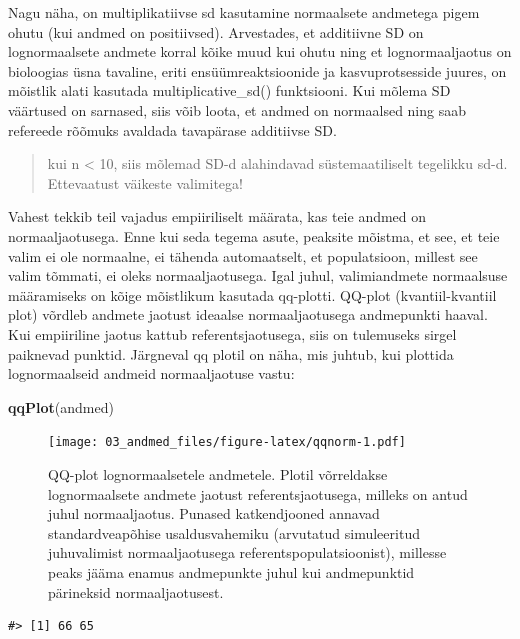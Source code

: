 \documentclass[]{book}
\newenvironment{Shaded}{\begin{snugshade}}{\end{snugshade}}
\newcommand{\KeywordTok}[1]{\textcolor[rgb]{0.13,0.29,0.53}{\textbf{#1}}}
\newcommand{\NormalTok}[1]{#1}
\begin{document}
Nagu näha, on multiplikatiivse sd kasutamine normaalsete andmetega pigem
ohutu (kui andmed on positiivsed). Arvestades, et additiivne SD on
lognormaalsete andmete korral kõike muud kui ohutu ning et
lognormaaljaotus on bioloogias üsna tavaline, eriti ensüümreaktsioonide
ja kasvuprotsesside juures, on mõistlik alati kasutada
multiplicative\_sd() funktsiooni. Kui mõlema SD väärtused on sarnased,
siis võib loota, et andmed on normaalsed ning saab refereede rõõmuks
avaldada tavapärase additiivse SD.

\begin{quote}
kui n \textless{} 10, siis mõlemad SD-d alahindavad süstemaatiliselt
tegelikku sd-d. Ettevaatust väikeste valimitega!
\end{quote}

Vahest tekkib teil vajadus empiiriliselt määrata, kas teie andmed on
normaaljaotusega. Enne kui seda tegema asute, peaksite mõistma, et see,
et teie valim ei ole normaalne, ei tähenda automaatselt, et
populatsioon, millest see valim tõmmati, ei oleks normaaljaotusega. Igal
juhul, valimiandmete normaalsuse määramiseks on kõige mõistlikum
kasutada qq-plotti. QQ-plot (kvantiil-kvantiil plot) võrdleb andmete
jaotust ideaalse normaaljaotusega andmepunkti haaval. Kui empiiriline
jaotus kattub referentsjaotusega, siis on tulemuseks sirgel paiknevad
punktid. Järgneval qq plotil on näha, mis juhtub, kui plottida
lognormaalseid andmeid normaaljaotuse vastu:








\begin{Shaded}
\begin{Highlighting}[]
\KeywordTok{qqPlot}\NormalTok{(andmed)}
\end{Highlighting}
\end{Shaded}

\begin{figure}
\centering
\texttt{[image: 03\_andmed\_files/figure-latex/qqnorm-1.pdf]}
\caption{\label{fig:qqnorm}QQ-plot lognormaalsetele andmetele. Plotil võrreldakse
lognormaalsete andmete jaotust referentsjaotusega, milleks on antud
juhul normaaljaotus. Punased katkendjooned annavad standardveapõhise
usaldusvahemiku (arvutatud simuleeritud juhuvalimist normaaljaotusega
referentspopulatsioonist), millesse peaks jääma enamus andmepunkte juhul
kui andmepunktid pärineksid normaaljaotusest.}
\end{figure}

\begin{verbatim}
#> [1] 66 65
\end{verbatim}
\end{document}
